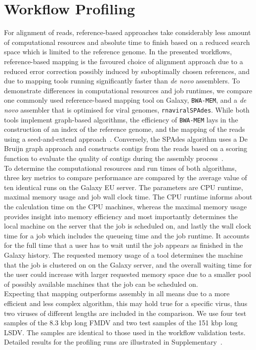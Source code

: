 \section{Workflow Profiling}
For alignment of reads, reference-based approaches take considerably less amount of computational resources and absolute time to finish based on a reduced search space which is limited to the reference genome. In the presented workflows, reference-based mapping is the favoured choice of alignment approach due to a reduced error correction possibly induced by suboptimally chosen references, and due to mapping tools running significantly faster than \textit{de novo} assemblers. To demonstrate differences in computational resources and job runtimes, we compare one commonly used reference-based mapping tool on Galaxy, \texttt{BWA-MEM}, and a \textit{de novo} assembler that is optimised for viral genomes, \texttt{rnaviralSPAdes}. While both tools implement graph-based algorithms, the efficiency of \texttt{BWA-MEM} lays in the construction of an index of the reference genome, and the mapping of the reads using a seed-and-extend approach~\cite{li2013aligning}. Conversely, the SPAdes algorithm uses a De Bruijn graph approach and constructs contigs from the reads based on a scoring function to evaluate the quality of contigs during the assembly process~\cite{bankevich2012spades}.\\
To determine the computational resources and run times of both algorithms, three key metrics to compare performance are compared by the average value of ten identical runs on the Galaxy EU server. The parameters are CPU runtime, maximal memory usage and job wall clock time. The CPU runtime informs about the calculation time on the CPU machines, whereas the maximal memory usage provides insight into memory efficiency and most importantly determines the local machine on the server that the job is scheduled on, and lastly the wall clock time for a job which includes the queueing time and the job runtime. It accounts for the full time that a user has to wait until the job appears as finished in the Galaxy history. The requested memory usage of a tool determines the machine that the job is clustered on on the Galaxy server, and the overall waiting time for the user could increase with larger requested memory space due to a smaller pool of possibly available machines that the job can be scheduled on.\\
Expecting that mapping outperforms assembly in all means due to a more efficient and less complex algorithm, this may hold true for a specific virus, thus two viruses of different lengths are included in the comparison. We use four test samples of the 8.3 kbp long \ac{FMDV} and two test samples of the 151 kbp long \ac{LSDV}. The samples are identical to those used in the workflow validation tests. Detailed results for the profiling runs are illustrated in Supplementary~. \\

